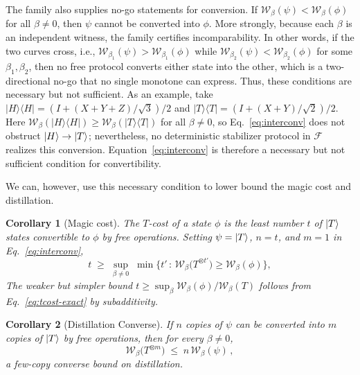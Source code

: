 \documentclass[aps,pra,superscriptaddress,twocolumn,longbibliography]{revtex4-2}
\newtheorem{corollary}{Corollary}
\def\mF{\mathcal{F}}
\newcommand{\ketbra}[2]{\vert #1 \rangle \langle #2 \vert}
\begin{document}
The family also supplies no-go statements for conversion.
If $\mathcal{W}_\beta(\psi)<\mathcal{W}_\beta(\phi)$ for all $\beta\neq0$, then $\psi$ cannot be converted into $\phi$.
More strongly, because each $\beta$ is an independent witness, the family certifies incomparability.
In other words, if the two curves cross, i.e., $\mathcal{W}_{\beta_1}(\psi)>\mathcal{W}_{\beta_1}(\phi)$ while $\mathcal{W}_{\beta_2}(\psi)<\mathcal{W}_{\beta_2}(\phi)$ for some $\beta_1,\beta_2$, then no free protocol converts either state into the other, which is a two-directional no-go that no single monotone can express.
Thus, these conditions are necessary but not sufficient.
As an example, take $\ketbra{H}{H}=(I+(X+Y+Z)/\sqrt{3})/2$ and $\ketbra{T}{T}=(I+(X+Y)/\sqrt{2})/2$.
Here $\mathcal{W}_{\beta}(\ketbra{H}{H})\ge\mathcal{W}_{\beta}(\ketbra{T}{T})$ for all $\beta\neq0$, so Eq.~\eqref{eq:interconv} does not obstruct $\ket{H}\to\ket{T}$; nevertheless, no deterministic stabilizer protocol in $\mF$ realizes this conversion.
Equation~\eqref{eq:interconv} is therefore a necessary but not sufficient condition for convertibility.




We can, however, use this necessary condition to lower bound the magic cost and distillation.
\begin{corollary}[Magic cost]
\label{cor:Tcost}
The $T$-cost of a state $\phi$ is the least number $t$ of
$\ket{T}$ states convertible to $\phi$ by free operations. Setting
$\psi=\ket{T}$, $n=t$, and $m=1$ in Eq.~\eqref{eq:interconv},
\begin{equation}
t\;\ge\;\sup_{\beta\neq0}\;
\min\Big\{t'\,:\,\mathcal{W}_\beta\!\big(T^{\otimes t'}\big)\ge
\mathcal{W}_\beta(\phi)\Big\},
\label{eq:tcost-exact}
\end{equation}
The weaker but simpler bound $t\ge\sup_\beta\mathcal{W}_\beta(\phi)/\mathcal{W}_\beta(T)$ follows from Eq.~\eqref{eq:tcost-exact} by subadditivity.
\end{corollary}

\begin{corollary}[Distillation Converse]
\label{cor:distill}
If $n$ copies of $\psi$ can be converted into $m$ copies of $\ket{T}$
by free operations, then for every $\beta\neq0$,
\begin{equation}
\mathcal{W}_\beta\!\big(T^{\otimes m}\big)\;\le\;n\,
\mathcal{W}_\beta(\psi)\,,
\end{equation}
a few-copy converse bound on distillation.
\end{corollary}
\end{document}
